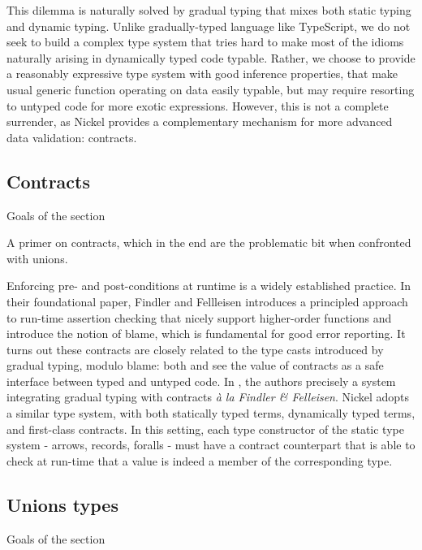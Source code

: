 \documentclass{article}
\begin{document}
This dilemma is naturally solved by gradual typing\cite{Siek06gradualtyping}
that mixes both static typing and dynamic typing. Unlike gradually-typed
language like TypeScript, we do not seek to build a complex type system that
tries hard to make most of the idioms naturally arising in dynamically typed
code typable. Rather, we choose to provide a reasonably expressive type system
with good inference properties, that make usual generic function operating on
data easily typable, but may require resorting to untyped code for more exotic
expressions.  However, this is not a complete surrender, as Nickel provides a
complementary mechanism for more advanced data validation: contracts.

\subsection{Contracts}
\color{red}Goals of the section

A primer on contracts, which in the end are the problematic bit when confronted
with unions.\vspace{0.5cm}

\color{black}


Enforcing pre- and post-conditions at runtime is a widely established practice.
In their foundational paper\cite{FindlerFelleisenHOContracts}, Findler and
Fellleisen introduces a principled approach to run-time assertion checking that
nicely support higher-order functions and introduce the notion of blame, which
is fundamental for good error reporting. It turns out these contracts are
closely related to the type casts introduced by gradual typing, modulo blame:
both \cite{FindlerMultiLang} and \cite{FelleisenInterLang} see the value of
contracts as a safe interface between typed and untyped code. In
\cite{WellTypedBlamed}, the authors precisely a system integrating gradual
typing with contracts \textit{à la Findler \& Felleisen}. Nickel adopts a
similar type system, with both statically typed terms, dynamically typed terms,
and first-class contracts. In this setting, each type constructor of the static
type system - arrows, records, foralls - must have a contract counterpart that
is able to check at run-time that a value is indeed a member of the
corresponding type.


\subsection{Unions types}
\color{red}Goals of the section
\end{document}
